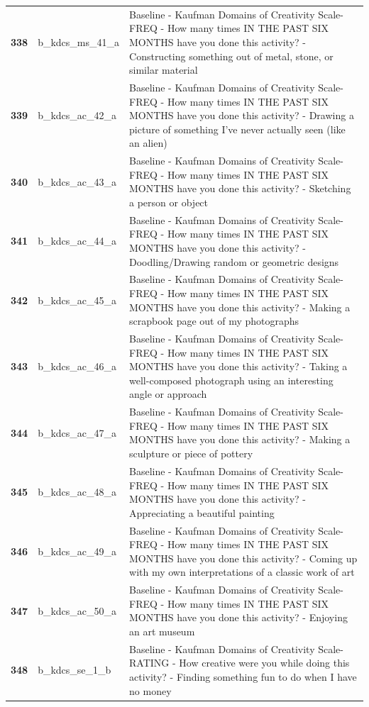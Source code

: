 \documentclass[
  letterpaper,
  DIV=11,
  numbers=noendperiod]{scrartcl}
\begin{document}
\begin{longtable}[t]{>{}cll}
\textbf{338} & b\_kdcs\_ms\_41\_a & Baseline - Kaufman Domains of Creativity Scale-FREQ - How many times IN THE PAST SIX MONTHS have you done this activity? - Constructing something out of metal, stone, or similar material\\
\textbf{339} & b\_kdcs\_ac\_42\_a & Baseline - Kaufman Domains of Creativity Scale-FREQ - How many times IN THE PAST SIX MONTHS have you done this activity? - Drawing a picture of something I've never actually seen (like an alien)\\
\textbf{340} & b\_kdcs\_ac\_43\_a & Baseline - Kaufman Domains of Creativity Scale-FREQ - How many times IN THE PAST SIX MONTHS have you done this activity? - Sketching a person or object\\
\addlinespace
\textbf{341} & b\_kdcs\_ac\_44\_a & Baseline - Kaufman Domains of Creativity Scale-FREQ - How many times IN THE PAST SIX MONTHS have you done this activity? - Doodling/Drawing random or geometric designs\\
\textbf{342} & b\_kdcs\_ac\_45\_a & Baseline - Kaufman Domains of Creativity Scale-FREQ - How many times IN THE PAST SIX MONTHS have you done this activity? - Making a scrapbook page out of my photographs\\
\textbf{343} & b\_kdcs\_ac\_46\_a & Baseline - Kaufman Domains of Creativity Scale-FREQ - How many times IN THE PAST SIX MONTHS have you done this activity? - Taking a well-composed photograph using an interesting angle or approach\\
\textbf{344} & b\_kdcs\_ac\_47\_a & Baseline - Kaufman Domains of Creativity Scale-FREQ - How many times IN THE PAST SIX MONTHS have you done this activity? - Making a sculpture or piece of pottery\\
\textbf{345} & b\_kdcs\_ac\_48\_a & Baseline - Kaufman Domains of Creativity Scale-FREQ - How many times IN THE PAST SIX MONTHS have you done this activity? - Appreciating a beautiful painting\\
\addlinespace
\textbf{346} & b\_kdcs\_ac\_49\_a & Baseline - Kaufman Domains of Creativity Scale-FREQ - How many times IN THE PAST SIX MONTHS have you done this activity? - Coming up with my own interpretations of a classic work of art\\
\textbf{347} & b\_kdcs\_ac\_50\_a & Baseline - Kaufman Domains of Creativity Scale-FREQ - How many times IN THE PAST SIX MONTHS have you done this activity? - Enjoying an art museum\\
\textbf{348} & b\_kdcs\_se\_1\_b & Baseline - Kaufman Domains of Creativity Scale-RATING - How creative were you while doing this activity? - Finding something fun to do when I have no money\\

\end{longtable}
\end{document}
